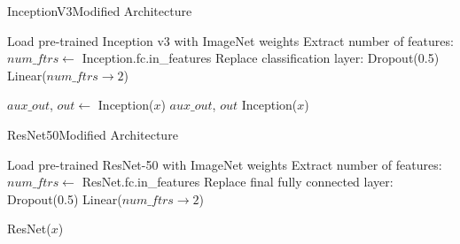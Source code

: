 \documentclass[a4paper,12pt]{article}
\begin{document}
                \begin{algorithm}
                    \caption{InceptionV3Modified Architecture}
                    \begin{algorithmic}[1]
                        \State Load pre-trained Inception v3 with ImageNet weights
                        \State Extract number of features: $num\_ftrs \gets$ Inception.fc.in\_features
                        \State Replace classification layer:
                        \Indent
                            \State Dropout(0.5)
                            \State Linear($num\_ftrs \to 2$) 
                        \EndIndent
                    \EndFunction
                    
                            \State $aux\_out$, $out \gets$ Inception($x$) 
                            \State \Return $aux\_out$, $out$
                        \Else
                            \State \Return Inception($x$)
                        \EndIf
                    \EndFunction
                    \end{algorithmic}
                    \end{algorithm}

                    \begin{algorithm}
                        \caption{ResNet50Modified Architecture}
                        \begin{algorithmic}[1]
                            \State Load pre-trained ResNet-50 with ImageNet weights
                            \State Extract number of features: $num\_ftrs \gets$ ResNet.fc.in\_features
                            \State Replace final fully connected layer:
                            \Indent
                                \State Dropout(0.5)
                                \State Linear($num\_ftrs \to 2$) 
                            \EndIndent
                        \EndFunction
                        
                            \State \Return ResNet($x$)
                        \EndFunction
                        \end{algorithmic}
                        \end{algorithm}
\end{document}
